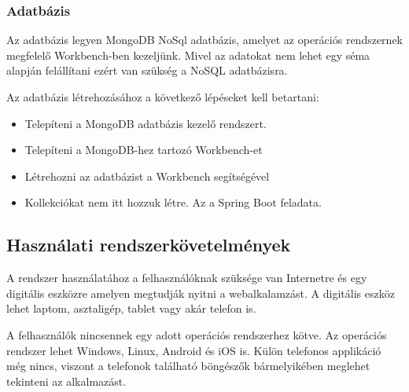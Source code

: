 \subsubsection{Adatbázis}
Az adatbázis legyen MongoDB NoSql adatbázis, amelyet az operációs rendszernek megfelelő Workbench-ben kezeljünk. Mivel az adatokat nem lehet egy séma alapján felállítani ezért van szükség a NoSQL adatbázisra. 

Az adatbázis létrehozásához a következő lépéseket kell betartani:
\begin{itemize}
	\item Telepíteni a MongoDB adatbázis kezelő rendszert.
	\item Telepíteni a MongoDB-hez tartozó Workbench-et
	\item Létrehozni az adatbázist a Workbench segítségével
	\item Kollekciókat nem itt hozzuk létre. Az a Spring Boot feladata.
\end{itemize}

\subsection{Használati rendszerkövetelmények}

A rendszer használatához a felhasználóknak szüksége van Internetre és egy digitális eszközre amelyen megtudják nyitni a webalkalamzást. A digitális eszköz lehet laptom, asztaligép, tablet vagy akár telefon is. 

A felhasználók nincsennek egy adott operációs rendszerhez kötve. Az operációs rendszer lehet Windows, Linux, Android és iOS is. Külön telefonos applikáció még nincs, viszont a telefonok található böngészők bármelyikében meglehet tekinteni az alkalmazást.